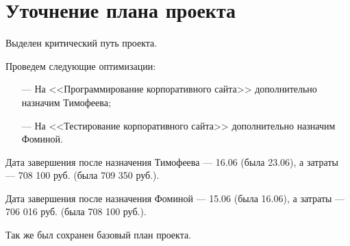 \section{Уточнение плана проекта}

Выделен критический путь проекта.


Проведем следующие оптимизации:

\begin{itemize}
    \item[---] На <<Программирование корпоративного сайта>> дополнительно назначим Тимофеева;
    \item[---] На <<Тестирование корпоративного сайта>> дополнительно назначим Фоминой.
\end{itemize}

Дата завершения после назначения Тимофеева --- 16.06 (была 23.06), а затраты --- 708 100 руб. (была 709 350 руб.).


\clearpage

Дата завершения после назначения Фоминой --- 15.06 (была 16.06), а затраты --- 706 016 руб. (была 708 100 руб.).


Так же был сохранен базовый план проекта.

